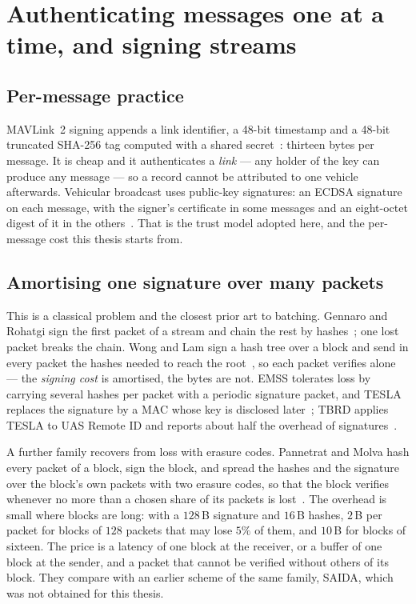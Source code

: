 \section{Authenticating messages one at a time, and signing streams}

\subsection{Per-message practice}\label{sec:bg-permsg}

MAVLink~2 signing appends a link identifier, a 48-bit timestamp and a 48-bit truncated SHA-256
tag computed with a shared secret~\cite{mavlink2signing}: thirteen bytes per message. It is cheap
and it authenticates a \emph{link} --- any holder of the key can produce any message --- so a
record cannot be attributed to one vehicle afterwards. Vehicular broadcast uses public-key
signatures: an ECDSA signature on each message, with the signer's certificate in some messages
and an eight-octet digest of it in the others~\cite{etsi_ts103097,ndss2024pqv2v}. That is the
trust model adopted here, and the per-message cost this thesis starts from.

\subsection{Amortising one signature over many packets}

This is a classical problem and the closest prior art to batching. Gennaro and Rohatgi sign the
first packet of a stream and chain the rest by hashes~\cite{gennaro1997streams}; one lost packet
breaks the chain. Wong and Lam sign a hash tree over a block and send in every packet the hashes
needed to reach the root~\cite{wong1999flows}, so each packet verifies alone --- the \emph{signing
cost} is amortised, the bytes are not. EMSS tolerates loss by carrying several hashes per packet
with a periodic signature packet, and TESLA replaces the signature by a MAC whose key is disclosed
later~\cite{perrig2000emss,perrig2002tesla}; TBRD applies TESLA to UAS Remote ID and reports
about half the overhead of signatures~\cite{veara2025tbrd}.

A further family recovers from loss with erasure codes. Pannetrat and Molva hash every packet
of a block, sign the block, and spread the hashes and the signature over the block's own
packets with two erasure codes, so that the block verifies whenever no more than a chosen share
of its packets is lost~\cite{pannetrat2003multicast}. The overhead is small where blocks are
long: with a $128$\,B signature and $16$\,B hashes, $2$\,B per packet for blocks of $128$
packets that may lose $5\%$ of them, and $10$\,B for blocks of sixteen. The price is a latency
of one block at the receiver, or a buffer of one block at the sender, and a packet that cannot
be verified without others of its block. They compare with an earlier scheme of the same
family, SAIDA, which was not obtained for this thesis.

